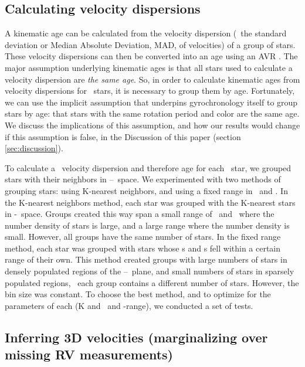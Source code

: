 \subsection{Calculating velocity dispersions}
\label{sec:velocity_dispersion}

A kinematic age can be calculated from the velocity dispersion (\eg\ the
standard deviation or Median Absolute Deviation, MAD, of velocities) of a
group of stars.
These velocity dispersions can then be converted into an age using an AVR
\citep[\eg][]{holmberg2009, yu2018}.
The major assumption underlying kinematic ages is that all stars used to
calculate a velocity dispersion are {\it the same age}.
So, in order to calculate kinematic ages from velocity dispersions for
\kepler\ stars, it is necessary to group them by age.
Fortunately, we can use the implicit assumption that underpins gyrochronology
itself to group stars by age: that stars with the same rotation period and
color are the same age.
We discuss the implications of this assumption, and how our results would
change if this assumption is false, in the Discussion of this paper (section
\ref{sec:discussion}).

To calculate a \vz\ velocity dispersion and therefore age for each \kepler\
star, we grouped stars with their neighbors in
\logp--\teff\ space.
We experimented with two methods of grouping stars: using K-nearest neighbors,
and using a fixed range in \logp\ and \teff.
In the K-nearest neighbors method, each star was grouped with the K-nearest
stars in \logp-\teff\ space.
Groups created this way span a small range of \logp\ and \teff\ where the
number density of stars is large, and a large range where the number density
is small.
However, all groups have the same number of stars.
In the fixed range method, each star was grouped with stars whose \logp s and
\teff s fell within a certain range of their own.
This method created groups with large numbers of stars in densely populated
regions of the \logp--\teff\ plane, and small numbers of stars in sparsely
populated regions, \ie\ each group contains a different number of stars.
However, the bin size was constant.
To choose the best method, and to optimize for the parameters of each (K and
\logp\ and \teff-range), we conducted a set of tests.

\subsection{Inferring 3D velocities (marginalizing over missing RV
measurements)}
\label{sec:velocity_inference}

